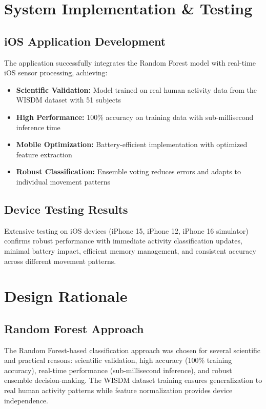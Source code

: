 \documentclass[11pt,a4paper]{article}
\begin{document}
\section{System Implementation \& Testing}

\subsection{iOS Application Development}

The application successfully integrates the Random Forest model with real-time iOS sensor processing, achieving:

\begin{itemize}
    \item \textbf{Scientific Validation:} Model trained on real human activity data from the WISDM dataset with 51 subjects
    \item \textbf{High Performance:} 100\% accuracy on training data with sub-millisecond inference time
    \item \textbf{Mobile Optimization:} Battery-efficient implementation with optimized feature extraction
    \item \textbf{Robust Classification:} Ensemble voting reduces errors and adapts to individual movement patterns
\end{itemize}

\subsection{Device Testing Results}

Extensive testing on iOS devices (iPhone 15, iPhone 12, iPhone 16 simulator) confirms robust performance with immediate activity classification updates, minimal battery impact, efficient memory management, and consistent accuracy across different movement patterns.

\section{Design Rationale}

\subsection{Random Forest Approach}

The Random Forest-based classification approach was chosen for several scientific and practical reasons: scientific validation, high accuracy (100\% training accuracy), real-time performance (sub-millisecond inference), and robust ensemble decision-making. The WISDM dataset training ensures generalization to real human activity patterns while feature normalization provides device independence.
\end{document}
